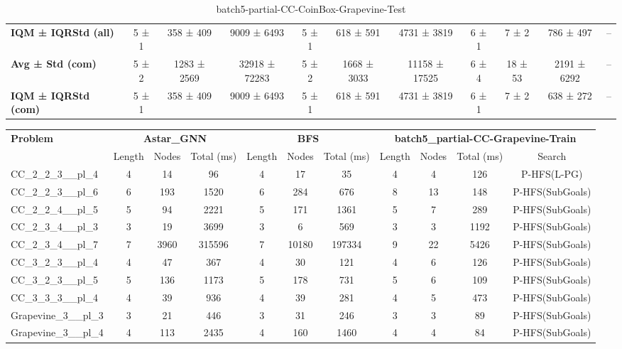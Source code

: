 \begin{table}[!ht]
\begin{tabular}{l|ccc|ccc|cccc}
\textbf{IQM ± IQRStd (all)} & 5 ± 1 & 358 ± 409 & 9009 ± 6493 & 5 ± 1 & 618 ± 591 & 4731 ± 3819 & 6 ± 1 & 7 ± 2 & 786 ± 497 & -- \\
\textbf{Avg ± Std (com)} & 5 ± 2 & 1283 ± 2569 & 32918 ± 72283 & 5 ± 2 & 1668 ± 3033 & 11158 ± 17525 & 6 ± 4 & 18 ± 53 & 2191 ± 6292 & -- \\
\textbf{IQM ± IQRStd (com)} & 5 ± 1 & 358 ± 409 & 9009 ± 6493 & 5 ± 1 & 618 ± 591 & 4731 ± 3819 & 6 ± 1 & 7 ± 2 & 638 ± 272 & -- \\
\end{tabular}
\caption{batch5-partial-CC-CoinBox-Grapevine-Test}
\label{tab:batch5_partial_CC-CoinBox-Grapevine_comparison_test}
\end{table}

\begin{table}[!ht]
\centering
\scriptsize
\begin{tabular}{l|ccc|ccc|cccc}
\multirow{2}{*}{\textbf{Problem}} & \multicolumn{3}{c|}{\textbf{Astar\_GNN}} & \multicolumn{3}{c|}{\textbf{BFS}} & \multicolumn{4}{c}{\textbf{batch5\_partial-CC-Grapevine-Train}} \\
\cline{2-11}
& Length & Nodes & Total (ms) & Length & Nodes & Total (ms) & Length & Nodes & Total (ms) & Search \\
\hline
CC\_2\_2\_3\_\_pl\_4 & 4 & 14 & 96 & 4 & 17 & 35 & 4 & 4 & 126 & P-HFS(L-PG) \\
CC\_2\_2\_3\_\_pl\_6 & 6 & 193 & 1520 & 6 & 284 & 676 & 8 & 13 & 148 & P-HFS(SubGoals) \\
CC\_2\_2\_4\_\_pl\_5 & 5 & 94 & 2221 & 5 & 171 & 1361 & 5 & 7 & 289 & P-HFS(SubGoals) \\
CC\_2\_3\_4\_\_pl\_3 & 3 & 19 & 3699 & 3 & 6 & 569 & 3 & 3 & 1192 & P-HFS(SubGoals) \\
CC\_2\_3\_4\_\_pl\_7 & 7 & 3960 & 315596 & 7 & 10180 & 197334 & 9 & 22 & 5426 & P-HFS(SubGoals) \\
CC\_3\_2\_3\_\_pl\_4 & 4 & 47 & 367 & 4 & 30 & 121 & 4 & 6 & 126 & P-HFS(SubGoals) \\
CC\_3\_2\_3\_\_pl\_5 & 5 & 136 & 1173 & 5 & 178 & 731 & 5 & 6 & 109 & P-HFS(SubGoals) \\
CC\_3\_3\_3\_\_pl\_4 & 4 & 39 & 936 & 4 & 39 & 281 & 4 & 5 & 473 & P-HFS(SubGoals) \\
Grapevine\_3\_\_pl\_3 & 3 & 21 & 446 & 3 & 31 & 246 & 3 & 3 & 89 & P-HFS(SubGoals) \\
Grapevine\_3\_\_pl\_4 & 4 & 113 & 2435 & 4 & 160 & 1460 & 4 & 4 & 84 & P-HFS(SubGoals) \\

\end{tabular}
\end{table}
